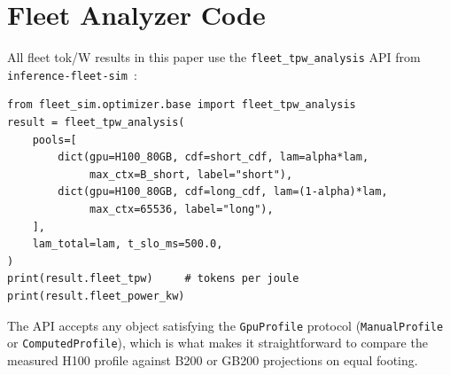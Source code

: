 \documentclass[11pt,a4paper]{article}
\begin{document}
\section{Fleet Analyzer Code}
\label{app:code}

All fleet tok/W results in this paper use the \texttt{fleet\_tpw\_analysis}
API from \texttt{inference-fleet-sim}~\citep{chen2026fleetsim}:

\begin{verbatim}
from fleet_sim.optimizer.base import fleet_tpw_analysis
result = fleet_tpw_analysis(
    pools=[
        dict(gpu=H100_80GB, cdf=short_cdf, lam=alpha*lam,
             max_ctx=B_short, label="short"),
        dict(gpu=H100_80GB, cdf=long_cdf, lam=(1-alpha)*lam,
             max_ctx=65536, label="long"),
    ],
    lam_total=lam, t_slo_ms=500.0,
)
print(result.fleet_tpw)     # tokens per joule
print(result.fleet_power_kw)
\end{verbatim}

The API accepts any object satisfying the \texttt{GpuProfile} protocol
(\texttt{ManualProfile} or \texttt{ComputedProfile}), which is what makes
it straightforward to compare the measured H100 profile against B200 or
GB200 projections on equal footing.
\end{document}
